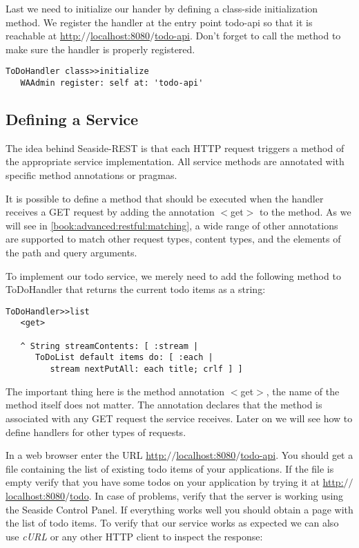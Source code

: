 \documentclass[a4paper,10pt,twoside]{book}
\newcommand{\ct}[1]{{\small\ttfamily\textup{#1}}}
\begin{document}
Last we need to initialize our hander by defining a class-side initialization method. We register the handler at the entry point \ct{todo-api} so that it is reachable at \href{http://localhost:8080/todo-api}{http:$/$$/$localhost:8080$/$todo-api}. Don't forget to call the method to make sure the handler is properly registered.

\begin{lstlisting}
ToDoHandler class>>initialize
   WAAdmin register: self at: 'todo-api'
\end{lstlisting}

\subsection{Defining a Service}
\label{book:advanced:restful:gettingstarted:defineservice}

The idea behind Seaside-REST is that each HTTP request triggers a method of the appropriate service implementation. All service methods are annotated with specific method annotations or pragmas. 

It is possible to define a method that should be executed when the handler receives a GET request by adding the annotation \ct{$<$get$>$} to the method. As we will see in \autoref{book:advanced:restful:matching}, a wide range of other annotations are supported to match other request types, content types, and the elements of the path and query arguments.

To implement our todo service, we merely need to add the following method to \ct{ToDoHandler} that returns the current todo items as a string:

\begin{lstlisting}
ToDoHandler>>list
   <get>
  	
   ^ String streamContents: [ :stream |
      ToDoList default items do: [ :each |
         stream nextPutAll: each title; crlf ] ]
\end{lstlisting}

 The important thing here is the method annotation \ct{$<$get$>$}, the name of the method itself does not matter. The annotation declares that the method is associated with any GET request the service receives. Later on we will see how to define handlers for other types of requests.

In a web browser enter the URL \href{http://localhost:8080/todo-api}{http:$/$$/$localhost:8080$/$todo-api}. You should get a file containing the list of existing todo items of your applications. If the file is empty verify that you have some todos on your application by trying it at \href{http://localhost:8080/todo}{http:$/$$/$localhost:8080$/$todo}. In case of problems, verify that the server is working using the Seaside Control Panel. If everything works well you should obtain a page with the list of todo items. To verify that our service works as expected we can also use \textit{cURL} or any other HTTP client to inspect the response:
\end{document}
